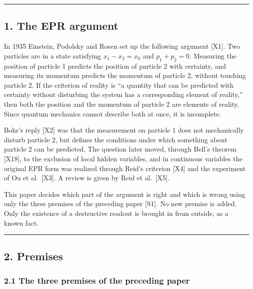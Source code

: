 \documentclass[
  a4paper,
]{article}
\begin{document}
\begin{center}\rule{0.5\linewidth}{0.5pt}\end{center}

\subsection{1. The EPR argument}\label{the-epr-argument}

In 1935 Einstein, Podolsky and Rosen set up the following argument
{[}X1{]}. Two particles are in a state satisfying \(x_1-x_2=x_0\) and
\(p_1+p_2=0\). Measuring the position of particle 1 predicts the
position of particle 2 with certainty, and measuring its momentum
predicts the momentum of particle 2, without touching particle 2. If the
criterion of reality is ``a quantity that can be predicted with
certainty without disturbing the system has a corresponding element of
reality,'' then both the position and the momentum of particle 2 are
elements of reality. Since quantum mechanics cannot describe both at
once, it is incomplete.

Bohr's reply {[}X2{]} was that the measurement on particle 1 does not
mechanically disturb particle 2, but defines the conditions under which
something about particle 2 can be predicted. The question later moved,
through Bell's theorem {[}X18{]}, to the exclusion of local hidden
variables, and in continuous variables the original EPR form was
realized through Reid's criterion {[}X4{]} and the experiment of Ou et
al.~{[}X3{]}. A review is given by Reid et al.~{[}X5{]}.

This paper decides which part of the argument is right and which is
wrong using only the three premises of the preceding paper {[}S1{]}. No
new premise is added. Only the existence of a destructive readout is
brought in from outside, as a known fact.

\begin{center}\rule{0.5\linewidth}{0.5pt}\end{center}

\subsection{2. Premises}\label{premises}

\subsubsection{2.1 The three premises of the preceding
paper}\label{the-three-premises-of-the-preceding-paper}
\end{document}
